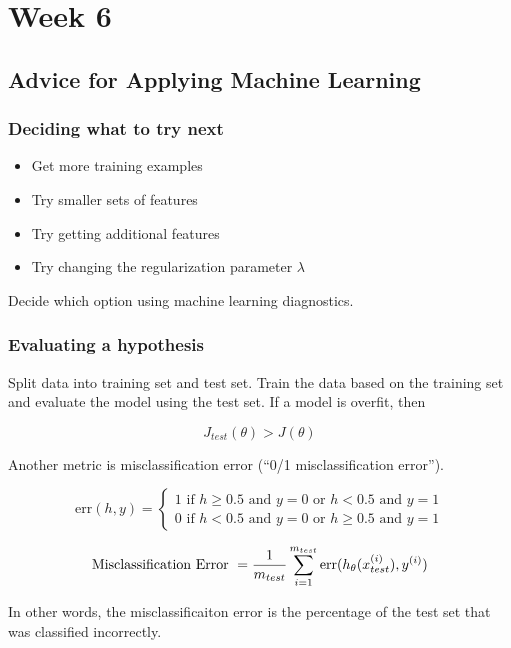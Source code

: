 \chapter{Week 6}

\section{Advice for Applying Machine Learning}

\subsection{Deciding what to try next}

\begin{itemize}
    \item Get more training examples
    \item Try smaller sets of features
    \item Try getting additional features
    \item Try changing the regularization parameter $\lambda$
\end{itemize}

Decide which option using machine learning diagnostics.

\subsection{Evaluating a hypothesis}

Split data into training set and test set.
Train the data based on the training set and evaluate the model using the test set.
If a model is overfit, then

\[ J_{test}(\theta) > J(\theta) \]

Another metric is misclassification error (``0/1 misclassification error'').

\[
    \mathrm{err}(h,y) = \begin{cases}
        1 \text{ if } h \geq 0.5 \text{ and } y=0 \text{ or } 
                      h < 0.5    \text{ and } y=1 \\
        0 \text{ if } h < 0.5    \text{ and } y=0 \text{ or } 
                      h \geq 0.5 \text{ and } y=1
    \end{cases}
\]

\[
    \text{Misclassification Error } = 
    \frac{1}{m_{test}} 
    \sum_{i=1}^{m_{test}} 
    \mathrm{err}(h_\theta(x_{test}^{(i)}), y_{}^{(i)})
\]

In other words, the misclassificaiton error is the percentage of
the test set that was classified incorrectly.

